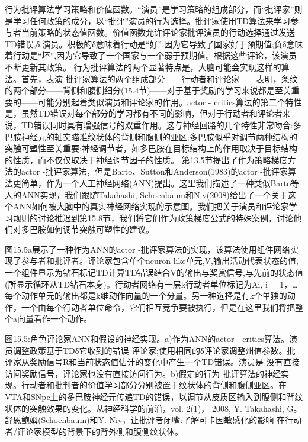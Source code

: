 行为批评算法学习策略和价值函数。“演员”是学习策略的组成部分，而“批评家”则是学习任何政策的成分，以“批评”演员的行为选择。批评家使用TD算法来学习参与者当前策略的状态值函数。价值函数允许评论家批评演员的行动选择通过发送TD错误,δ,演员。积极的δ意味着行动是“好”,因为它导致了国家好于预期值;负δ意味着行动是“坏”,因为它导致了一个国家与一个弱于预期值。根据这些评论，该演员不断更新其政策。
行为批评算法的两个显著特点是，大脑可能会实现这样的算法。首先，表演-批评家算法的两个组成部分——行动者和评论家——表明，条纹的两个部分——背侧和腹侧细分(15.4节)——对于基于奖励的学习来说都是至关重要的——可能分别起着类似演员和评论家的作用。actor - critics算法的第二个特性是，虽然TD错误对每个部分的学习都有不同的影响，但对于行动者和评论者来说，TD错误同时具有增强信号的双重作用。这与神经回路的几个特性非常吻合:多巴胺神经元的轴突瞄准纹状体的背侧和腹侧的亚区;多巴胺似乎对调节两种结构的突触可塑性至关重要;神经调节者，如多巴胺在目标结构上的作用取决于目标结构的性质，而不仅仅取决于神经调节因子的性质。
第13.5节提出了作为策略梯度方法的actor -批评家算法，但是Barto、Sutton和Anderson(1983)的actor -批评家算法更简单，作为一个人工神经网络(ANN)提出。这里我们描述了一种类似Barto等人的ANN实现，我们跟随Takahashi, Schoenbaum和Niv(2008)给出了一个关于这个ANN如何被大脑中的真实神经网络实现的示意图。我们把关于演员和评论家学习规则的讨论推迟到第15.8节，我们将它们作为政策梯度公式的特殊案例，讨论他们对多巴胺如何调节突触可塑性的建议。

图15.5a展示了一种作为ANN的actor -批评家算法的实现，该算法使用组件网络实现了参与者和批评者。评论家包含单个neuron-like单元,V,输出活动代表状态的值,一个组件显示为钻石标记TD计算TD错误结合V的输出与奖赏信号,与先前的状态值(所显示循环从TD钻石本身)。行动者网络有一层k行动者单位标记为Ai, i = 1，…每个动作单元的输出都是k维动作向量的一个分量。另一种选择是有k个单独的动作，一个由每个行动者单位命令，它们相互竞争要被执行，但是在这里我们将把整个a向量看作一个动作。

图15.5:角色评论家ANN和假设的神经实现。a)作为ANN的actor - critics算法。演员调整政策基于TDδ它收到的错误
评论家;使用相同的δ评论家调整州值参数。批评家从奖励信号R和当前状态值估计的变化中产生一个TD错误。演员是
没有直接访问奖励信号，评论家也没有直接访问行为。b)假定的行为-批评算法的神经实现。行动者和批判者的价值学习部分分别被置于纹状体的背侧和腹侧亚区。在VTA和SNpc上的多巴胺神经元传递TD的错误，以调节从皮质区输入到腹侧和背纹状体的突触效果的变化。从神经科学的前沿，vol. 2(1)， 2008, Y. Takahashi, G。
舒恩鲍姆(Schoenbaum)和Y. Niv，让批评者闭嘴:了解可卡因敏感化的影响
在行动者/评论家模型的背景下的背外侧和腹侧纹状体。

